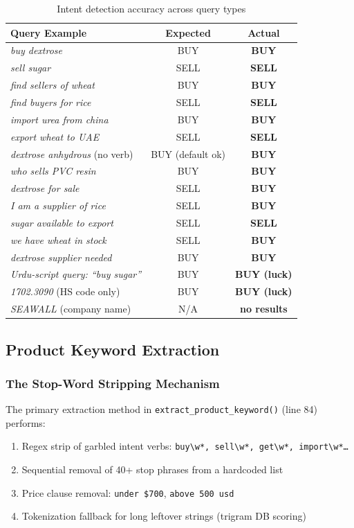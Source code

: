 \documentclass[12pt,a4paper]{article}
\newcommand{\cellOK}[1]{\cellcolor{okBg}\textcolor{zaraiGreen}{\textbf{#1}}}
\newcommand{\cellWarn}[1]{\cellcolor{warningBg}\textcolor{zaraiAmber}{\textbf{#1}}}
\newcommand{\cellBad}[1]{\cellcolor{errorBg}\textcolor{zaraiRed}{\textbf{#1}}}
\begin{document}
\begin{table}[H]
\centering
\renewcommand{\arraystretch}{1.3}
\begin{tabularx}{\textwidth}{Xcc}
\toprule
\textbf{Query Example} & \textbf{Expected} & \textbf{Actual} \\
\midrule
\textit{buy dextrose} & BUY & \cellOK{BUY} \\
\textit{sell sugar} & SELL & \cellOK{SELL} \\
\textit{find sellers of wheat} & BUY & \cellOK{BUY} \\
\textit{find buyers for rice} & SELL & \cellOK{SELL} \\
\textit{import urea from china} & BUY & \cellOK{BUY} \\
\textit{export wheat to UAE} & SELL & \cellOK{SELL} \\
\textit{dextrose anhydrous} (no verb) & BUY (default ok) & \cellOK{BUY} \\
\textit{who sells PVC resin} & BUY & \cellOK{BUY} \\
\textit{dextrose for sale} & SELL & \cellBad{BUY} \\
\textit{I am a supplier of rice} & SELL & \cellBad{BUY} \\
\textit{sugar available to export} & SELL & \cellOK{SELL} \\
\textit{we have wheat in stock} & SELL & \cellBad{BUY} \\
\textit{dextrose supplier needed} & BUY & \cellOK{BUY} \\
\textit{Urdu-script query: ``buy sugar''} & BUY & \cellWarn{BUY (luck)} \\
\textit{1702.3090} (HS code only) & BUY & \cellWarn{BUY (luck)} \\
\textit{SEAWALL} (company name) & N/A & \cellBad{no results} \\
\bottomrule
\end{tabularx}
\caption{Intent detection accuracy across query types}
\end{table}

\subsection{Product Keyword Extraction}

\subsubsection{The Stop-Word Stripping Mechanism}

The primary extraction method in \texttt{extract\_product\_keyword()} (line 84) performs:
\begin{enumerate}
  \item Regex strip of garbled intent verbs: \texttt{buy\textbackslash w*, sell\textbackslash w*, get\textbackslash w*, import\textbackslash w*\ldots}
  \item Sequential removal of 40+ stop phrases from a hardcoded list
  \item Price clause removal: \texttt{under \$700}, \texttt{above 500 usd}
  \item Tokenization fallback for long leftover strings (trigram DB scoring)
\end{enumerate}
\end{document}
